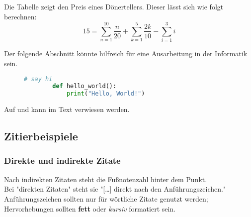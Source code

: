Die Tabelle zeigt den Preis eines Dönertellers. Dieser lässt sich wie folgt berechnen:
\begin{equation}
    15 = \sum_{n=1}^{10} \frac{n}{20} + \sum_{k=1}^{5} \frac{2k}{10} - \sum_{i=1}^{3} i
\end{equation}%

Der folgende Abschnitt könnte hilfreich für eine Ausarbeitung in der Informatik sein.
\begin{figure}[H] %
    \begin{lstlisting}[language=python]
        # say hi
        def hello_world():
            print("Hello, World!")
    \end{lstlisting}
    \label{fig:meincode}%
\end{figure}


Auf  und  kann im Text verwiesen werden.%

\subsection{Zitierbeispiele}

\subsubsection{Direkte und indirekte Zitate}

Nach indirekten Zitaten steht die Fußnotenzahl hinter dem Punkt.\\%
Bei "direkten Zitaten" steht sie "[\ldots] direkt nach den Anführungszeichen."\\%
Anführungszeichen sollten nur für wörtliche Zitate genutzt werden; Hervorhebungen sollten \textbf{fett} oder \textit{kursiv} formatiert sein.

